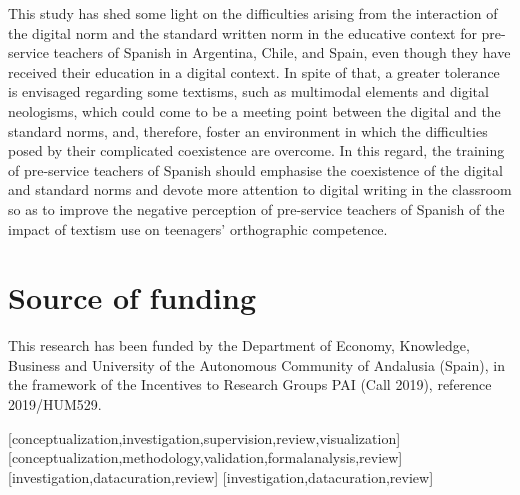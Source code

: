 \documentclass{textolivre}
\begin{document}
This study has shed some light on the difficulties arising from the interaction of the digital norm and the standard written norm in the educative context for pre-service teachers of Spanish in Argentina, Chile, and Spain, even though they have received their education in a digital context. In spite of that, a greater tolerance is envisaged regarding some textisms, such as multimodal elements and digital neologisms, which could come to be a meeting point between the digital and the standard norms, and, therefore, foster an environment in which the difficulties posed by their complicated coexistence are overcome. In this regard, the training of pre-service teachers of Spanish should emphasise the coexistence of the digital and standard norms and devote more attention to digital writing in the classroom so as to improve the negative perception of pre-service teachers of Spanish of the impact of textism use on teenagers’ orthographic competence.


\section{Source of funding}
This research has been funded by the Department of Economy, Knowledge, Business and University of the Autonomous Community of Andalusia (Spain), in the framework of the Incentives to Research Groups PAI (Call 2019), reference 2019/HUM529.

\printbibliography\label{sec-bib}

\begin{contributors}
[conceptualization,investigation,supervision,review,visualization]
[conceptualization,methodology,validation,formalanalysis,review]
[investigation,datacuration,review]
[investigation,datacuration,review]
\end{contributors}

\end{document}
